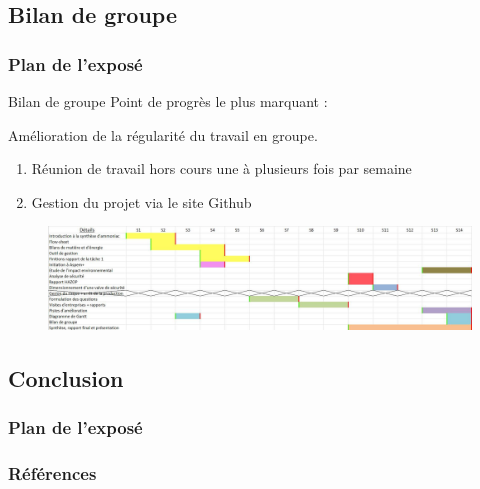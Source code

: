 \documentclass{beamer}
\begin{document}
	
	\begin{frame}
	        \section{Bilan de groupe}
		\frametitle{Plan de l'exposé}
		\tableofcontents[currentsubsection,sectionstyle=show/shaded,subsectionstyle=show/shaded/hide]
	\end{frame}
	
	\begin{frame}{Bilan de groupe}
		{\LARGE Point de progrès le plus marquant :}
		
		Amélioration de la régularité du travail en groupe.
		\begin{enumerate}
		\item Réunion de travail hors cours une à plusieurs fois par semaine
		\item Gestion du projet via le site Github
		\end{enumerate}
		\begin{figure}
			\centering
			\includegraphics[scale=0.17]{media/DiagrammeDeGantt.png}
		\end{figure}
	\end{frame}
	
	\begin{frame}
		\section{Conclusion}
		\frametitle{Plan de l'exposé}
		\tableofcontents[currentsubsection,sectionstyle=show/shaded,subsectionstyle=show/shaded/hide]
	\end{frame}
	
	\begin{frame}[allowframebreaks]
	\frametitle{Références}
		\tiny
		
		
		\nocite{*}
	\end{frame}
	
\end{document}
